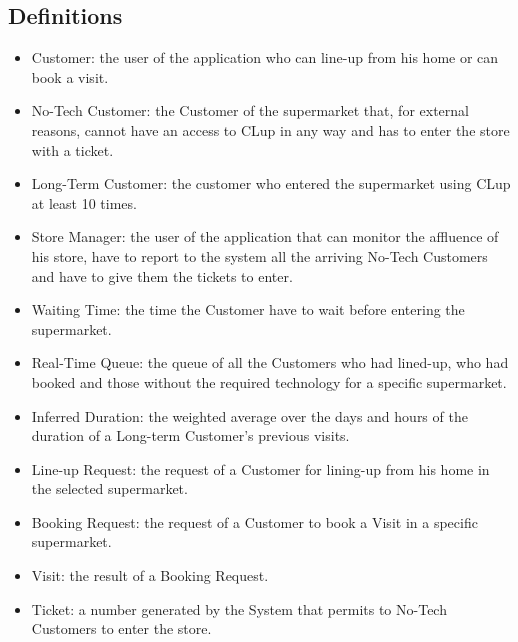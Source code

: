 \subsection{Definitions}

\begin{itemize}
	\item Customer: the user of the application who can line-up from his home or can book a visit.
	\item No-Tech Customer: the Customer of the supermarket that, for external reasons, cannot have an access to CLup in any way and has to enter the store with a ticket.
	\item Long-Term Customer: the customer who entered the supermarket using CLup at least 10 times.
	\item Store Manager: the user of the application that can monitor the affluence of his store, have to report to the system all the arriving No-Tech Customers and have to give them the tickets to enter.
	\item Waiting Time: the time the Customer have to wait before entering the supermarket.
	\item Real-Time Queue: the queue of all the Customers who had lined-up, who had booked and those without the required technology for a specific supermarket.
	\item Inferred Duration: the weighted average over the days and hours of the duration of a Long-term Customer's previous visits.
	\item Line-up Request: the request of a Customer for lining-up from his home in the selected supermarket.
	\item Booking Request: the request of a Customer to book a Visit in a specific supermarket.
	\item Visit: the result of a Booking Request.
	\item Ticket: a number generated by the System that permits to No-Tech Customers to enter the store.
\end{itemize}



 
 